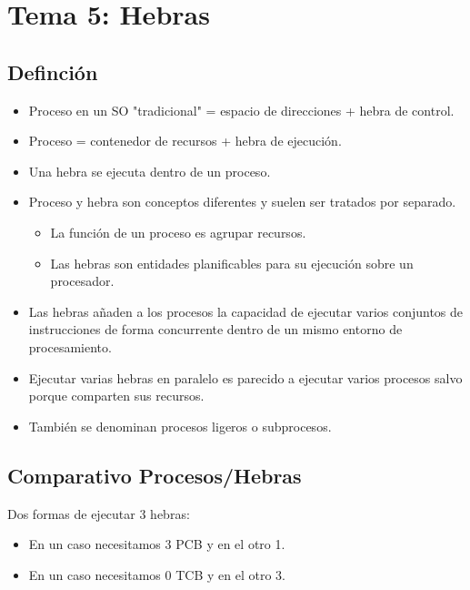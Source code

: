 \documentclass{article}
\begin{document}
\section{Tema 5: Hebras}
\subsection{Definción}
\begin{itemize}
\item Proceso en un SO "tradicional" = espacio de direcciones + hebra de control.

\item Proceso = contenedor de recursos + hebra de ejecución.

\item Una hebra se ejecuta dentro de un proceso.

\item Proceso y hebra son conceptos diferentes y suelen ser tratados por separado.
	\begin{itemize}
	\item La función de un proceso es agrupar recursos.
	
	\item Las hebras son entidades planificables para su ejecución sobre un procesador.
	\end{itemize}
	
\item Las hebras añaden a los procesos la capacidad de ejecutar varios conjuntos de instrucciones de forma concurrente dentro de un mismo entorno de procesamiento.

\item Ejecutar varias hebras en paralelo es parecido a ejecutar varios procesos salvo porque comparten sus recursos.

\item También se denominan procesos ligeros o subprocesos.
\end{itemize}

\subsection{Comparativo Procesos/Hebras}
Dos formas de ejecutar 3 hebras:
\begin{itemize}
\item En un caso necesitamos 3 PCB y en el otro 1.

\item En un caso necesitamos 0 TCB y en el otro 3.
\end{itemize}
\end{document}
